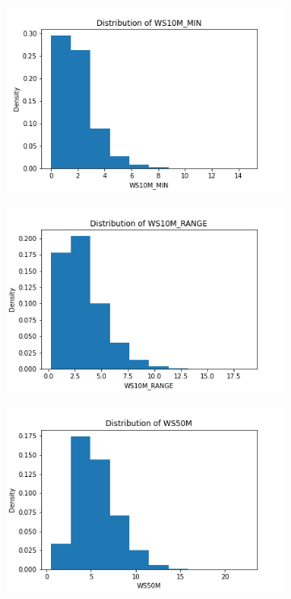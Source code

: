 \documentclass{article}
\begin{document}
\begin{itemize}
\begin{figure}[htbp]
\begin{subfigure}{0.3\textwidth}
                \includegraphics[width=\linewidth]{pic/hist/Distribution WS10M_MIN .png}
            \end{subfigure}
            \begin{subfigure}{0.3\textwidth}
                \centering
                \includegraphics[width=\linewidth]{pic/hist/Distribution WS10M_RANGE .png}
            \end{subfigure}
            \begin{subfigure}{0.3\textwidth}
                \centering
                \includegraphics[width=\linewidth]{pic/hist/Distribution WS50M .png}

\end{subfigure}
\end{figure}
\end{itemize}
\end{document}
